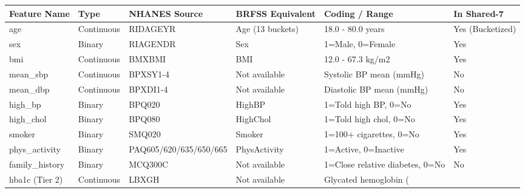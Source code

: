 \begin{tabular}{llllll}
\toprule
Feature Name & Type & NHANES Source & BRFSS Equivalent & Coding / Range & In Shared-7 \\
\midrule
age & Continuous & RIDAGEYR & Age (13 buckets) & 18.0 - 80.0 years & Yes (Bucketized) \\
sex & Binary & RIAGENDR & Sex & 1=Male, 0=Female & Yes \\
bmi & Continuous & BMXBMI & BMI & 12.0 - 67.3 kg/m2 & Yes \\
mean_sbp & Continuous & BPXSY1-4 & Not available & Systolic BP mean (mmHg) & No \\
mean_dbp & Continuous & BPXDI1-4 & Not available & Diastolic BP mean (mmHg) & No \\
high_bp & Binary & BPQ020 & HighBP & 1=Told high BP, 0=No & Yes \\
high_chol & Binary & BPQ080 & HighChol & 1=Told high chol, 0=No & Yes \\
smoker & Binary & SMQ020 & Smoker & 1=100+ cigarettes, 0=No & Yes \\
phys_activity & Binary & PAQ605/620/635/650/665 & PhysActivity & 1=Active, 0=Inactive & Yes \\
family_history & Binary & MCQ300C & Not available & 1=Close relative diabetes, 0=No & No \\
hba1c (Tier 2) & Continuous & LBXGH & Not available & Glycated hemoglobin (%
\bottomrule
\end{tabular}
